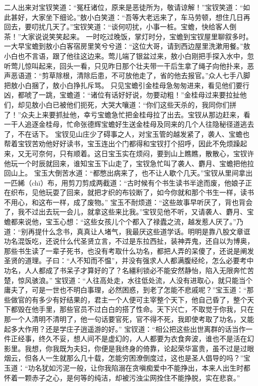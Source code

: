 \documentclass[12pt,oneside]{book}
\begin{document}
二人出来对宝钗笑道：“冤枉诸位，原来是恶徒所为，敬请谅解！”宝钗笑道：“如此甚好，大家坐下细论。”敖小白笑道：“吾等大老远来了，车马劳顿，想住几日再回去，要叨扰几天了。”宝钗笑道：“谈何叨扰，小事一桩。宝蟾，快给客人倒茶！”大家说说笑笑起来。
一时吃过晚饭，掌灯时分，宝蟾到宝钗屋里聊叙多时。一大早宝蟾到敖小白客宿房里笑兮兮道：“这位大哥，请到西边屋里洗漱用餐。”敖小白也不言语，跟了他往这边来。莺儿端了银盆过来，敖小白刚把手探入水中，忽听莺儿惊叫起来，回头一看，只见昨日那个壮夫带一干后生拿了绳子向他扑来，恶声恶语道：“剪草除根，清除后患，不可放他走了，省的他去报官。”众人七手八脚把敖小白捆了，敖小白挣扎斥骂。
只见宝蟾引金桂母急匆匆进来，看见他们要行凶，都唬了一跳，宝蟾道：“诸位有话好好说，勿要动粗！”金桂母过来要拉扯他们，却见敖小白已被他们扼死，大哭大嚷道：“你们这些天杀的，我同你们拼了！”众夫上来要抓扯他，幸亏宝蟾急忙把金桂母拉了出去。宝钗从那边赶来，看一干人追逐金桂母，忙命张德辉宝蟾好生送金桂母及同来的几个人往隐秘径道逃去了，不在话下。
宝钗见山庄少了碍事之人，对宝玉管的越发紧了，袭人、宝蟾也帮着宝钗苦劝他好好读书，宝玉连出个门都得和宝钗打个招呼，因此不免烦躁起来，又无可奈何，只有顺着。这日宝玉实在烦闷，要到山上瞧瞧，散散心，宝钗许他玩一个时辰就回来，谁知宝玉下山走了，宝钗急忙叫了袭人、麝月、宝蟾把他拉回山上。
宝玉大倒苦水道：“都憋出病来了，也不让人歇个几天。”宝钗从里间拿出一匹絺（chī）布，用剪刀剪成两截道：“古时候有个书生读书半途而废，他娘子正在织布，见他玩耍了回来，就把才织的布铰断了，如今你就和那个书生一样，读书不用心，和这布一样，成了废物。”
宝玉不耐烦道：“这些故事早听厌了，背也背会了，我不过出去玩一会儿，就拿这些来比我。”宝钗见他不听，又请袭人、麝月、宝蟾都来说他，宝玉心想：“这些女孩儿个个都入了禄蠹之流，越发惹人厌了。”乃道：“别再提什么念书，真真让人堵气，我最厌这些道学话。明明是靠八股文章诓功名混饭吃，还说什么代圣贤立言，不过是东拉西扯，装神弄鬼，还自以为博奥，那些书生读了一辈子死书，也没有考取什么功名，都把人弄的呆傻了，还说是阐发圣贤的道理。子曰：“人不知而不愠”，并没有强求人人都满腹经纶，怎么必要考中功名，人人都成了书呆子才算好的了？名繮利锁必不能安然静怡，陷入无限奔忙苦楚，惊风骇浪。”
宝钗道：“人往高处走，水往低处流，人没有进取心，就只能当个庸夫了，可是一世也不明白事理，必然困惑，到老了怎能不悲戚呢？”宝玉道：“那些做官的有多少有好结果的，君主一个人便可主宰整个天下，他自己昏了，整个天下都毁在他手里，那些官员不过白白的搭了性命。天下兴亡，不取觉于你我，只在那一个人清明不清明了，他一句话要官死，官不得不死，我即使考取了功名，又能起多大作用？还是学庄子逍遥游的好。”
宝钗道：“相公把这些出世离群的话当作一件正经事，终久不妥，想人间不是虚幻的，人人都要为衣食奔波，谁也不是活在幻影里。我想，你我既为夫妇，你便是我终身的倚靠，论起荣华富贵，虽不过是过眼烟云，但各人一生就那么几十载，怎能穷困潦倒度过，这也是圣人倡导的吗？”宝玉道：“功名犹如污泥一般，让你我陷溺在贪嗔痴爱中不能挣出，本来人出生时都怀着一颗赤子之心，是何等的纯洁，却被污浊尘网拴住不能挣脱，实在悲哀。”
\end{document}
